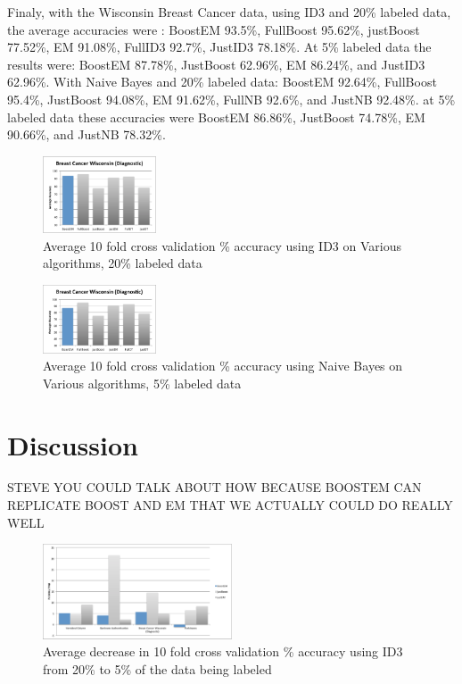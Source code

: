 \documentclass{sig-alternate}
\begin{document}
Finaly, with the Wisconsin Breast Cancer data, using ID3 and 20\% labeled data, the average accuracies were : BoostEM 93.5\%, FullBoost 95.62\%, justBoost 77.52\%, EM 91.08\%, FullID3 92.7\%, JustID3 78.18\%. At 5\% labeled data the results were: BoostEM 87.78\%, JustBoost 62.96\%, EM 86.24\%, and JustID3 62.96\%.
With Naive Bayes and 20\% labeled data: BoostEM 92.64\%, FullBoost 95.4\%, JustBoost 94.08\%, EM 91.62\%, FullNB 92.6\%, and JustNB 92.48\%. at 5\% labeled data these accuracies were BoostEM 86.86\%, JustBoost 74.78\%, EM 90.66\%, and JustNB 78.32\%.
\begin{figure}[ht!]
\centering
\includegraphics[width=0.3\textwidth]{figures/breaAcc.pdf}
\caption{Average 10 fold cross validation \% accuracy using ID3 on Various algorithms, 20\% labeled data}
\label{breaAcc}
\end{figure}
\begin{figure}[ht!]
\centering
\includegraphics[width=0.3\textwidth]{figures/breaAcc5.pdf}
\caption{Average 10 fold cross validation \% accuracy using Naive Bayes on Various algorithms, 5\% labeled data}
\label{breaAcc5}
\end{figure}
 

\section{Discussion}
STEVE 
YOU COULD TALK ABOUT HOW BECAUSE BOOSTEM CAN REPLICATE BOOST AND EM THAT WE ACTUALLY COULD DO REALLY WELL

\begin{figure}
\centering
\includegraphics[width=0.5\textwidth]{figures/accDrops.pdf}
\caption{Average decrease in 10 fold cross validation \% accuracy using ID3 from 20\% to 5\% of the data being labeled}
\label{accDrop}
\end{figure}
\end{document}
